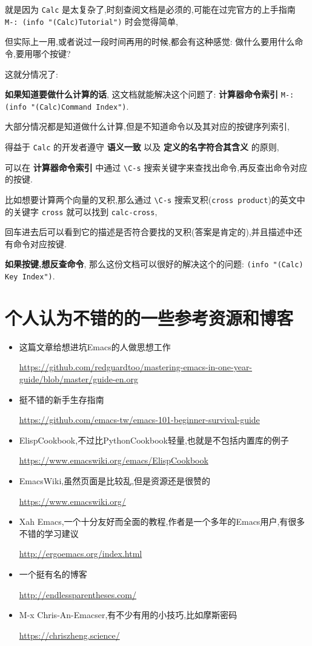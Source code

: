 \documentclass[11pt]{article}
\begin{document}
就是因为 \texttt{Calc} 是太复杂了,时刻查阅文档是必须的,可能在过完官方的上手指南 \texttt{M-: (info "(Calc)Tutorial")} 时会觉得简单,

但实际上一用,或者说过一段时间再用的时候,都会有这种感觉: 做什么要用什么命令,要用哪个按键?

这就分情况了:

\textbf{如果知道要做什么计算的话}, 这文档就能解决这个问题了: \textbf{计算器命令索引} \texttt{M-: (info "(Calc)Command Index")}.

大部分情况都是知道做什么计算,但是不知道命令以及其对应的按键序列索引,

得益于 \texttt{Calc} 的开发者遵守 \textbf{语义一致} 以及 \textbf{定义的名字符合其含义} 的原则,

可以在 \textbf{计算器命令索引} 中通过 \texttt{\textbackslash{}C-s} 搜索关键字来查找出命令,再反查出命令对应的按键.

比如想要计算两个向量的叉积,那么通过 \texttt{\textbackslash{}C-s} 搜索叉积(\texttt{cross product})的英文中的关键字 \texttt{cross} 就可以找到 \texttt{calc-cross},

回车进去后可以看到它的描述是否符合要找的叉积(答案是肯定的),并且描述中还有命令对应按键.

\textbf{如果按键,想反查命令}, 那么这份文档可以很好的解决这个的问题: \texttt{(info "(Calc) Key Index")}.


\section{个人认为不错的的一些参考资源和博客}
\label{sec:org8e48402}

\begin{itemize}
\item 这篇文章给想进坑Emacs的人做思想工作

\url{https://github.com/redguardtoo/mastering-emacs-in-one-year-guide/blob/master/guide-en.org}

\item 挺不错的新手生存指南

\url{https://github.com/emacs-tw/emacs-101-beginner-survival-guide}

\item ElispCookbook,不过比PythonCookbook轻量,也就是不包括内置库的例子

\url{https://www.emacswiki.org/emacs/ElispCookbook}

\item EmacsWiki,虽然页面是比较乱,但是资源还是很赞的

\url{https://www.emacswiki.org/}

\item Xah Emacs,一个十分友好而全面的教程,作者是一个多年的Emacs用户,有很多不错的学习建议

\url{http://ergoemacs.org/index.html}

\item 一个挺有名的博客

\url{http://endlessparentheses.com/}

\item M-x Chris-An-Emacser,有不少有用的小技巧,比如摩斯密码

\url{https://chriszheng.science/}
\end{itemize}
\end{document}
